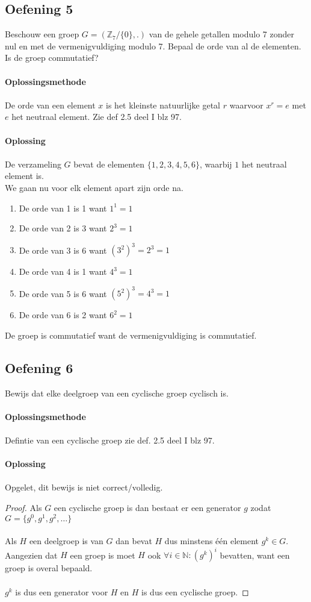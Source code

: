\documentclass[11pt,a4paper,titlepage]{article}
\begin{document}
\subsection{Oefening 5}
Beschouw een groep $ G = (\mathbb{Z}_7/\{0\},.)$ van de gehele getallen modulo 7 zonder nul en met de vermenigvuldiging modulo 7. Bepaal de orde van al de elementen. Is de groep commutatief?
\\ \\ \textbf{Oplossingsmethode} \\ \\
De orde van een element $x$ is het kleinste natuurlijke getal $r$ waarvoor $x^r = e$ met $e$ het neutraal element. Zie def 2.5 deel I blz 97.
\\ \\ \textbf{Oplossing} \\ \\
De verzameling $G$ bevat de elementen $\{1,2,3,4,5,6\}$, waarbij $1$ het neutraal element is.\\ We gaan nu voor elk element apart zijn orde na.
\begin{enumerate}
	\item De orde van 1 is 1 want $1^1 = 1$
	\item De orde van 2 is 3 want $2^3 = 1$
	\item De orde van 3 is 6 want $(3^2)^3= 2^3 = 1$
	\item De orde van 4 is 1 want $4^3 =  1$
	\item De orde van 5 is 6 want $(5^2)^3 = 4^3 = 1$
	\item De orde van 6 is 2 want $6^2 = 1$
\end{enumerate}
De groep is commutatief want de vermenigvuldiging is commutatief.
\subsection{Oefening 6}
Bewijs dat elke deelgroep van een cyclische groep cyclisch is.
\\ \\ \textbf{Oplossingsmethode} \\ \\
Defintie van een cyclische groep zie def. 2.5 deel I blz 97.
\\ \\ \textbf{Oplossing} \\ \\
Opgelet, dit bewijs is niet correct/volledig.
\begin{proof}
Als $G$ een cyclische groep is dan bestaat er een generator $g$ zodat $G = \{g^0, g^1, g^2, \dots \}$\\ \\
Als $H$ een deelgroep is van $G$ dan bevat $H$ dus minstens één element $g^k \in G$. \\
Aangezien dat $H$ een groep is moet $H$ ook $\forall i \in \mathbb{N}: (g^k)^i$ bevatten, want een groep is overal bepaald.\\ \\
$g^k$ is dus een generator voor $H$ en $H$ is dus een cyclische groep.
\end{proof}
\newpage
\end{document}
